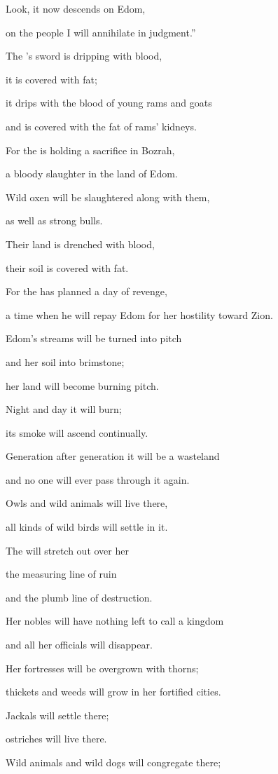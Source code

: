 {\par }{\Q Look,
it now descends
on
Edom,
\par }{\Q on
the people
I will annihilate
in judgment.”
\par }{\Q {}The
{}’s
sword
is dripping with blood,
\par }{\Q it is covered with fat;
\par }{\Q it drips with the blood of young rams and goats
\par }{\Q and is covered with the fat of rams’ kidneys.
\par }{\Q For the
{} is holding a sacrifice in Bozrah,
\par }{\Q a bloody slaughter in the land of Edom.
\par }{\Q {}Wild oxen
will be slaughtered
along with
them,
\par }{\Q as well as strong
bulls.
\par }{\Q Their land
is drenched
with blood,
\par }{\Q their soil
is covered
with fat.
\par }{\Q {}For
the {}
has planned a day
of revenge,
\par }{\Q a time
when he will repay
Edom for her hostility
toward Zion.
\par }{\Q {}Edom’s
streams
will be
turned into
pitch
\par }{\Q and her soil
into brimstone;
\par }{\Q her land
will become burning
pitch.
\par }{\Q {}Night
and day
it will burn;
\par }{\Q its smoke
will
ascend
continually.
\par }{\Q Generation
after generation
it will be a wasteland
\par }{\Q and no
one will ever
pass through it again.
\par }{\Q {}Owls
and wild animals
will live
there,

\par }{\Q all kinds of wild birds
will settle in
it.
\par }{\Q The
{} will stretch out
over
her
\par }{\Q the measuring line
of ruin
\par }{\Q and the plumb line
of destruction.
\par }{\Q {}Her nobles
will have nothing
left
to call
a kingdom
\par }{\Q and all
her officials
will disappear.
\par }{\Q {}Her fortresses
will be overgrown
with thorns;
\par }{\Q thickets
and weeds
will grow in her fortified cities.
\par }{\Q Jackals
will settle
there;
\par }{\Q ostriches will live there.
\par }{\Q {}Wild animals
and wild dogs
will congregate
there;

}
